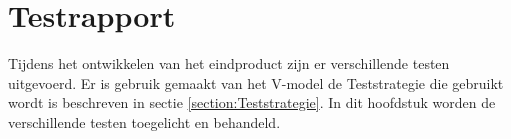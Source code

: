 \section{Testrapport}
Tijdens het ontwikkelen van het eindproduct zijn er verschillende testen uitgevoerd.
Er is gebruik gemaakt van het V-model de Teststrategie die gebruikt wordt is beschreven in sectie \ref{section:Teststrategie}.
In dit hoofdstuk worden de verschillende testen toegelicht en behandeld.





